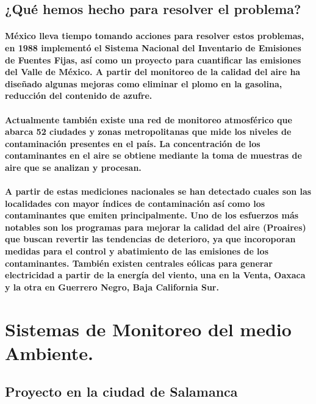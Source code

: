     \subsection {¿Qué hemos hecho para resolver el problema?}
    \paragraph {México lleva tiempo tomando acciones para resolver estos problemas, en 1988 implementó el Sistema Nacional del Inventario de Emisiones de Fuentes Fijas, así como un proyecto para cuantificar las emisiones del Valle de México. A partir del monitoreo de la calidad del aire ha diseñado algunas mejoras como eliminar el plomo en la gasolina, reducción del contenido de azufre.}

    \paragraph {Actualmente también existe una red de monitoreo atmosférico que abarca 52 ciudades y zonas metropolitanas que mide los niveles de contaminación presentes en el país. La concentración de los contaminantes en el aire se obtiene mediante la toma de muestras de aire que se analizan y procesan.}

    \paragraph {A partir de estas mediciones nacionales se han detectado cuales son las localidades con mayor índices de contaminación así como los contaminantes que emiten principalmente.  Uno de los esfuerzos más notables son los programas para mejorar la calidad del aire (Proaires) que buscan revertir las tendencias de deterioro, ya que incoroporan medidas para el control y abatimiento de las emisiones de los contaminantes.  También existen centrales eólicas para generar electricidad a partir de la energía del viento, una en la Venta, Oaxaca y la otra en Guerrero Negro, Baja California Sur.}

  \section {Sistemas de Monitoreo del medio Ambiente.}
    \subsection {Proyecto en la ciudad de Salamanca}
